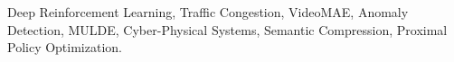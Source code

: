 \author{
}

\author[1]{Khushi}
\address[1]{SCSET, Bennett University, Greater Noida, UP, India}

\author*[1]{ \sur{}}

\begin{IEEEkeywords}
Deep Reinforcement Learning, Traffic Congestion, VideoMAE, Anomaly Detection, MULDE, Cyber-Physical Systems, Semantic Compression, Proximal Policy Optimization.
\end{IEEEkeywords}
